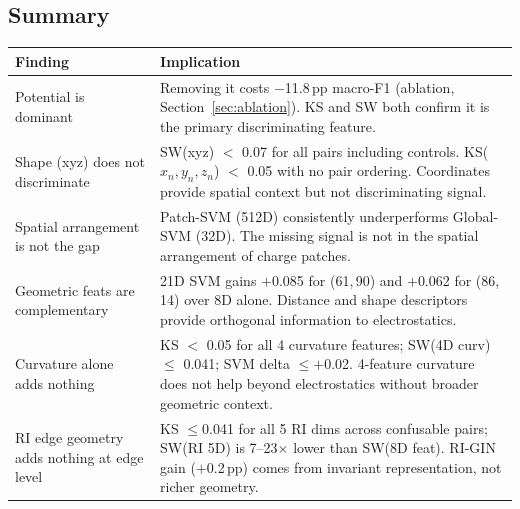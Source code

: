 \subsection{Summary}
\label{sec:analysis:summary}

\begin{center}
  \begin{tabular}{lp{9.2cm}}
    \toprule
    \textbf{Finding} & \textbf{Implication} \\
    \midrule
    Potential is dominant & Removing it costs $-$11.8\,pp macro-F1
                            (ablation, Section~\ref{sec:ablation}).
                            KS and SW both confirm it is the primary
                            discriminating feature. \\[3pt]
    Shape (xyz) does not discriminate & SW(xyz) $<$ 0.07 for all pairs
                            including controls.
                            KS($x_n, y_n, z_n$) $<$ 0.05 with no pair ordering.
                            Coordinates provide spatial context but not
                            discriminating signal. \\[3pt]
    Spatial arrangement is not the gap & Patch-SVM (512D) consistently
                            underperforms Global-SVM (32D).
                            The missing signal is not in the spatial
                            arrangement of charge patches. \\[3pt]
    Geometric feats are complementary & 21D SVM gains $+$0.085 for (61,\,90)
                            and $+$0.062 for (86,\,14) over 8D alone.
                            Distance and shape descriptors provide orthogonal
                            information to electrostatics. \\[3pt]
    Curvature alone adds nothing & KS $<$ 0.05 for all 4 curvature features;
                            SW(4D curv) $\leq$ 0.041; SVM delta $\leq+$0.02.
                            4-feature curvature does not help beyond
                            electrostatics without broader geometric context. \\[3pt]
    RI edge geometry adds nothing at edge level & KS $\leq$0.041 for all 5 RI
                            dims across confusable pairs; SW(RI 5D) is 7--23$\times$
                            lower than SW(8D feat).
                            RI-GIN gain ($+$0.2\,pp) comes from invariant
                            representation, not richer geometry. \\[3pt]

\end{tabular}
\end{center}
